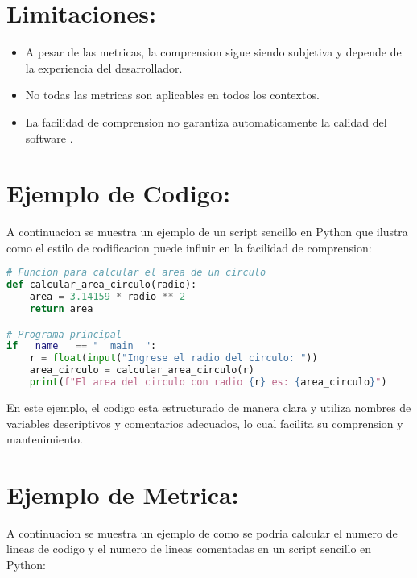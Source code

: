 \documentclass{article}
\begin{document}
\section*{Limitaciones:}
\begin{itemize}
  \item A pesar de las metricas, la comprension sigue siendo subjetiva y depende de la experiencia del desarrollador.
  \item No todas las metricas son aplicables en todos los contextos.
  \item La facilidad de comprension no garantiza automaticamente la calidad del software \cite{tesis_espe}.
\end{itemize}

\section*{Ejemplo de Codigo:}

A continuacion se muestra un ejemplo de un script sencillo en Python que ilustra como el estilo de codificacion puede influir en la facilidad de comprension:

\begin{lstlisting}[language=Python, caption=Ejemplo de script en Python para calcular el area de un circulo]
# Funcion para calcular el area de un circulo
def calcular_area_circulo(radio):
    area = 3.14159 * radio ** 2
    return area

# Programa principal
if __name__ == "__main__":
    r = float(input("Ingrese el radio del circulo: "))
    area_circulo = calcular_area_circulo(r)
    print(f"El area del circulo con radio {r} es: {area_circulo}")
\end{lstlisting}

En este ejemplo, el codigo esta estructurado de manera clara y utiliza nombres de variables descriptivos y comentarios adecuados, lo cual facilita su comprension y mantenimiento.

\section*{Ejemplo de Metrica:}

A continuacion se muestra un ejemplo de como se podria calcular el numero de lineas de codigo y el numero de lineas comentadas en un script sencillo en Python:
\end{document}
